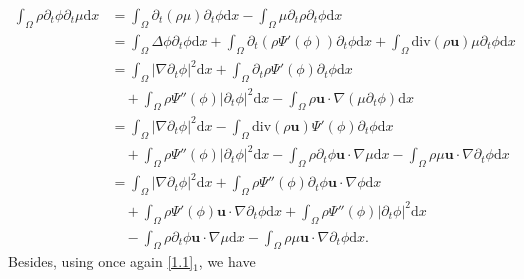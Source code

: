 \documentclass[11pt]{article}
\numberwithin{equation}{section}
\begin{document}
\begin{equation}
\begin{split}\label{4.14}
\int_{\Omega}\rho\partial_t\phi\partial_t\mu\mathrm{d}x&
=\int_{\Omega}\partial_t(\rho\mu)\partial_t
\phi\mathrm{d}x
-\int_{\Omega}\mu\partial_t\rho\partial_t\phi\mathrm{d}x\\
&=\int_{\Omega}\Delta\phi\partial_t\phi\mathrm{d}x
+\int_{\Omega}\partial_t(\rho\Psi'(\phi))\partial_t\phi\mathrm{d}x
+\int_{\Omega}\text{div}(\rho\mathbf{u})\mu\partial_t\phi\mathrm{d}x\\
&=\int_{\Omega}|\nabla\partial_t\phi|^2\mathrm{d}x
+\int_{\Omega}\partial_t\rho\Psi'(\phi)\partial_t\phi\mathrm{d}x\\
&\quad+\int_{\Omega}\rho\Psi''(\phi)|\partial_t\phi|^2\mathrm{d}x
-\int_{\Omega}\rho\mathbf{u}\cdot\nabla(\mu\partial_t\phi)\mathrm{d}x\\
&=\int_{\Omega}|\nabla\partial_t\phi|^2\mathrm{d}x
-\int_{\Omega}\text{div}(\rho\mathbf{u})\Psi'(\phi)\partial_t\phi\mathrm{d}x\\
&\quad+\int_{\Omega}\rho\Psi''(\phi)|\partial_t\phi|^2\mathrm{d}x
-\int_{\Omega}\rho\partial_t\phi\mathbf{u}\cdot\nabla\mu\mathrm{d}x
-\int_{\Omega}\rho\mu\mathbf{u}\cdot\nabla\partial_t\phi\mathrm{d}x\\
&=\int_{\Omega}|\nabla\partial_t\phi|^2\mathrm{d}x
+\int_{\Omega}\rho\Psi''(\phi)\partial_t\phi\mathbf{u}\cdot
\nabla\phi\mathrm{d}x\\
&\quad+\int_{\Omega}\rho\Psi'(\phi)\mathbf{u}
\cdot\nabla\partial_t\phi\mathrm{d}x+\int_{\Omega}\rho\Psi''(\phi)
|\partial_t\phi|^2\mathrm{d}x\\
&\quad-\int_{\Omega}\rho\partial_t\phi\mathbf{u}\cdot\nabla\mu\mathrm{d}x - \int_{\Omega}\rho\mu\mathbf{u}\cdot\nabla\partial_t\phi\mathrm{d}x.
\end{split}
\end{equation}
Besides, using once again \eqref{1.1}$_{1}$, we have
\end{document}

